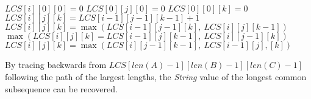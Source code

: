 \documentclass[12pt]{article}
\begin{document}
\begin{algorithm}[H]
\\ 
\Init\\
\\
{$LCS[i][0][0] = 0$}
{$LCS[0][j][0] = 0$}
{$LCS[0][0][k] = 0$}
\Calc\\
{
{
{
{$LCS[i][j][k] = LCS[i-1][j-1][k-1] + 1$}
{$LCS[i][j][k]=\max(LCS[i-1][j-1][k],\ LCS[i][j][k-1])$}
{$\max(LCS[i][j][k]=LCS[i-1][j][k-1],\ LCS[i][j-1][k])$}
{$LCS[i][j][k] = \max(LCS[i][j-1][k-1],\ LCS[i-1][j],[k])$}
}
}
}
\end{algorithm}
By tracing backwards from $LCS[len(A)-1][len(B)-1][len(C)-1]$
following the path of the largest lengths, the \textit{String}
value of the longest common subsequence can be recovered.
\end{document}
